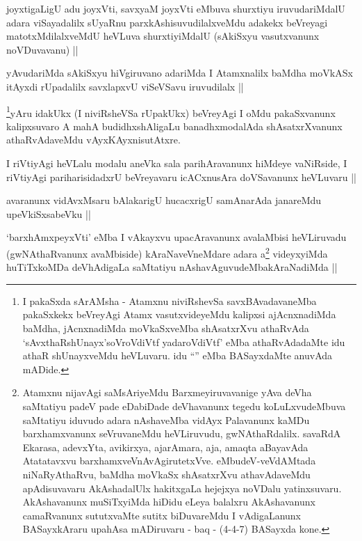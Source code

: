 
\begin{artha}
joyxtigaLigU adu joyxVti, savxyaM joyxVti eMbuva shurxtiyu
iruvudariMdalU adara viSayadalilx sUyaRnu parxkAshisuvudilalxveMdu
adakekx beVreyagi matotxMdilalxveMdU heVLuva shurxtiyiMdalU (sAkiSxyu
vasutxvanunx noVDuvavanu) ||
\end{artha}


\begin{artha}
yAvudariMda sAkiSxyu hiVgiruvano adariMda I Atamxnalilx baMdha moVkASx
itAyxdi rUpadalilx savxlapxvU viSeVSavu iruvudilalx ||
\end{artha}


\begin{artha}
\footnote{I pakaSxda sArAMsha - Atamxnu niviRshevSa savxBAvadavaneMba
  pakaSxkekx beVreyAgi Atamx vasutxvideyeMdu kalipxsi ajAcnxnadiMda
  baMdha, jAcnxnadiMda moVkaSxveMba shAsatxrXvu athaRvAda
  `sAvxthaRshUnayx'soV\s roVdiVtf yadaroVdiVtf' eMba athaRvAdadaMte
  idu athaR shUnayxveMdu heVLuvaru. idu ``\stext'' eMba BASayxdaMte
  anuvAda mADide.}yAru idakUkx (I niviRsheVSa rUpakUkx) beVreyAgi I oMdu
pakaSxvanunx kalipxsuvaro A mahA budidhxshAligaLu banadhxmodalAda
shAsatxrXvanunx athaRvAdaveMdu vAyxKAyxnisutAtxre.
\end{artha}

\begin{artha}
I riVtiyAgi heVLalu modalu aneVka sala parihAravanunx hiMdeye
vaNiRside, I riVtiyAgi pariharisidadxrU beVreyavaru icACxnusAra
doVSavanunx heVLuvaru ||
\end{artha}

\begin{artha}
avaranunx vidAvxMsaru bAlakarigU hucacxrigU samAnarAda janareMdu
upeVkiSxsabeVku ||
\end{artha}


\begin{artha}
`barxhAmxpeyxVti' eMba I vAkayxvu upacAravanunx avalaMbisi heVLiruvadu
  (gwNAthaRvanunx avaMbiside) kAraNaveVneMdare adara
  a\footnote{Atamxnu nijavAgi saMsAriyeMdu Barxmeyiruvavanige yAva
    deVha saMtatiyu padeV pade eDabiDade deVhavanunx tegedu
    koLuLxvudeMbuva saMtatiyu iduvudo adara nAshaveMba vidAyx
    Palavanunx kaMDu barxhamxvanunx seVruvaneMdu heVLiruvudu,
    gwNAthaRdalilx. savaRdA Ekarasa, adevxYta, avikirxya, ajarAmara,
    aja, amaqta aBayavAda Atatatavxvu
    barxhamxveVnAvAgirutetxVve. eMbudeV-veVdAMtada niNaRyAthaRvu,
    baMdha moVkaSx shAsatxrXvu athavAdaveMdu apAdisuvavaru
    AkAshadalUlx hakitxgaLa hejejxya noVDalu
    yatinxsuvaru. AkAshavanunx muSiTxyiMda hiDidu eLeya balalxru
    AkAshavanunx camaRvanunx sututxvaMte sutitx biDuvareMdu I
    vAdigaLanunx BASayxkAraru upahAsa mADiruvaru - baq - (4-4-7)
    BASayxda kone.} videyxyiMda huTiTxkoMDa deVhAdigaLa saMtatiyu
  nAshavAguvudeMbakAraNadiMda ||
\end{artha}
